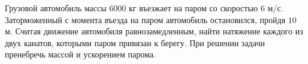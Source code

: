 Грузовой автомобиль массы $6000$ кг въезжает на паром со скоростью $6$ м/с.
Заторможенный с момента въезда на паром автомобиль остановился, пройдя $10$ м.
Считая движение автомобиля равнозамедленным,
найти натяжение каждого из двух канатов, которыми паром привязан к берегу.
При решении задачи пренебречь массой и ускорением парома.
